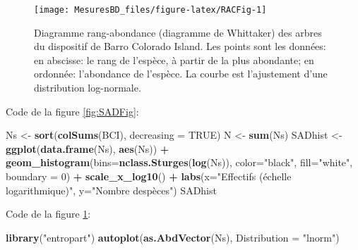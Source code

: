 \documentclass[
  11pt,
  french,
  a4paper,
  extrafontsizes,onecolumn,openright
  ]{memoir}
\newenvironment{Shaded}{\begin{snugshade}}{\end{snugshade}}
\newcommand{\AttributeTok}[1]{\textcolor[rgb]{0.13,0.29,0.53}{#1}}
\newcommand{\ConstantTok}[1]{\textcolor[rgb]{0.56,0.35,0.01}{#1}}
\newcommand{\DecValTok}[1]{\textcolor[rgb]{0.00,0.00,0.81}{#1}}
\newcommand{\FunctionTok}[1]{\textcolor[rgb]{0.13,0.29,0.53}{\textbf{#1}}}
\newcommand{\NormalTok}[1]{#1}
\newcommand{\OtherTok}[1]{\textcolor[rgb]{0.56,0.35,0.01}{#1}}
\newcommand{\SpecialCharTok}[1]{\textcolor[rgb]{0.81,0.36,0.00}{\textbf{#1}}}
\newcommand{\StringTok}[1]{\textcolor[rgb]{0.31,0.60,0.02}{#1}}
\begin{document}
\scriptsize

\begin{figure}

{\centering \texttt{[image: MesuresBD\_files/figure-latex/RACFig-1]} 

}

\caption{Diagramme rang-abondance (diagramme de Whittaker) des arbres du dispositif de Barro Colorado Island. Les points sont les données: en abscisse: le rang de l'espèce, à partir de la plus abondante; en ordonnée: l'abondance de l'espèce. La courbe est l'ajustement d'une distribution log-normale.}\label{fig:RACFig}
\end{figure}

\normalsize

Code de la figure \ref{fig:SADFig}:

\scriptsize

\begin{Shaded}
\begin{Highlighting}[]
\NormalTok{Ns }\OtherTok{\textless{}{-}} \FunctionTok{sort}\NormalTok{(}\FunctionTok{colSums}\NormalTok{(BCI), }\AttributeTok{decreasing =} \ConstantTok{TRUE}\NormalTok{)}
\NormalTok{N }\OtherTok{\textless{}{-}} \FunctionTok{sum}\NormalTok{(Ns)}
\NormalTok{SADhist }\OtherTok{\textless{}{-}} \FunctionTok{ggplot}\NormalTok{(}\FunctionTok{data.frame}\NormalTok{(Ns), }\FunctionTok{aes}\NormalTok{(Ns)) }\SpecialCharTok{+} 
  \FunctionTok{geom\_histogram}\NormalTok{(}\AttributeTok{bins=}\FunctionTok{nclass.Sturges}\NormalTok{(}\FunctionTok{log}\NormalTok{(Ns)), }
       \AttributeTok{color=}\StringTok{"black"}\NormalTok{, }\AttributeTok{fill=}\StringTok{"white"}\NormalTok{, }\AttributeTok{boundary =} \DecValTok{0}\NormalTok{) }\SpecialCharTok{+}
  \FunctionTok{scale\_x\_log10}\NormalTok{() }\SpecialCharTok{+}
  \FunctionTok{labs}\NormalTok{(}\AttributeTok{x=}\StringTok{"Effectifs (échelle logarithmique)"}\NormalTok{, }
       \AttributeTok{y=}\StringTok{"Nombre d\textquotesingle{}espèces"}\NormalTok{)}
\NormalTok{SADhist}
\end{Highlighting}
\end{Shaded}

\normalsize

Code de la figure \ref{fig:RACFig}:

\scriptsize

\begin{Shaded}
\begin{Highlighting}[]
\FunctionTok{library}\NormalTok{(}\StringTok{"entropart"}\NormalTok{)}
\FunctionTok{autoplot}\NormalTok{(}\FunctionTok{as.AbdVector}\NormalTok{(Ns), }\AttributeTok{Distribution =} \StringTok{"lnorm"}\NormalTok{)}
\end{Highlighting}
\end{Shaded}
\end{document}
